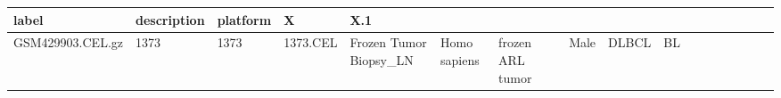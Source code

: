 \documentclass[]{article}
\begin{document}
\begin{longtable}[]{@{}lllllllrllllllllll@{}}
\begin{minipage}[b]{0.01\columnwidth}
label\strut
\end{minipage} & \begin{minipage}[b]{0.08\columnwidth}\raggedright
description\strut
\end{minipage} & \begin{minipage}[b]{0.01\columnwidth}\raggedright
platform\strut
\end{minipage} & \begin{minipage}[b]{0.00\columnwidth}\raggedright
X\strut
\end{minipage} & \begin{minipage}[b]{0.01\columnwidth}\raggedright
X.1\strut
\end{minipage}\tabularnewline
\midrule
\endhead
\begin{minipage}[t]{0.03\columnwidth}\raggedright
GSM429903.CEL.gz\strut
\end{minipage} & \begin{minipage}[t]{0.02\columnwidth}\raggedright
1373\strut
\end{minipage} & \begin{minipage}[t]{0.01\columnwidth}\raggedright
1373\strut
\end{minipage} & \begin{minipage}[t]{0.02\columnwidth}\raggedright
1373.CEL\strut
\end{minipage} & \begin{minipage}[t]{0.06\columnwidth}\raggedright
Frozen Tumor Biopsy\_LN\strut
\end{minipage} & \begin{minipage}[t]{0.02\columnwidth}\raggedright
Homo sapiens\strut
\end{minipage} & \begin{minipage}[t]{0.04\columnwidth}\raggedright
frozen ARL tumor\strut
\end{minipage} & \begin{minipage}[t]{0.05\columnwidth}\raggedleft
37\strut
\end{minipage} & \begin{minipage}[t]{0.04\columnwidth}\raggedright
Male\strut
\end{minipage} & \begin{minipage}[t]{0.06\columnwidth}\raggedright
DLBCL\strut
\end{minipage} & \begin{minipage}[t]{0.06\columnwidth}\raggedright
BL\strut
\end{minipage} & \begin{minipage}[t]{0.04\columnwidth}\raggedright

\end{minipage}
\end{longtable}
\end{document}

